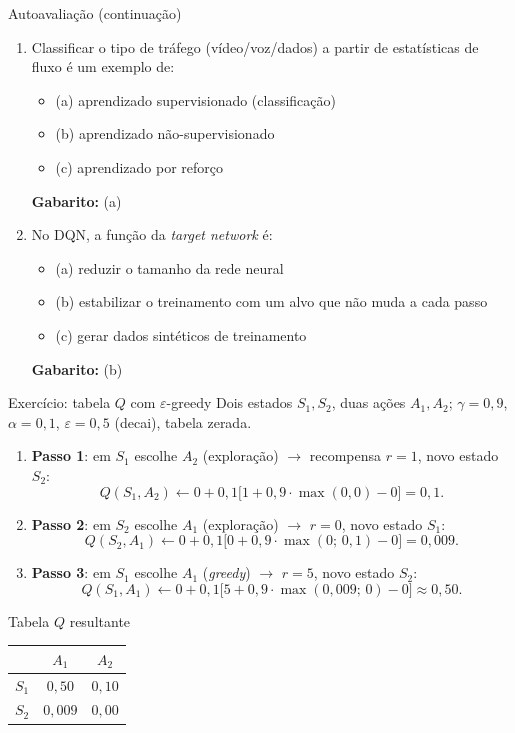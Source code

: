\documentclass[aspectratio=169,11pt]{beamer}
\begin{document}
\begin{frame}{Autoavaliação (continuação)}
  \begin{enumerate}
    \item Classificar o tipo de tráfego (vídeo/voz/dados) a partir de estatísticas de fluxo é um exemplo de:
      \begin{itemize}
        \item (a) aprendizado supervisionado (classificação)
        \item (b) aprendizado não-supervisionado
        \item (c) aprendizado por reforço
      \end{itemize}
      \pause
      \textbf{Gabarito:} (a)

    \item No DQN, a função da \emph{target network} é:
      \begin{itemize}
        \item (a) reduzir o tamanho da rede neural
        \item (b) estabilizar o treinamento com um alvo que não muda a cada passo
        \item (c) gerar dados sintéticos de treinamento
      \end{itemize}
      \pause
      \textbf{Gabarito:} (b)
  \end{enumerate}
\end{frame}

\begin{frame}{Exercício: tabela $Q$ com $\varepsilon$-greedy}
  Dois estados $S_1,S_2$, duas ações $A_1,A_2$; $\gamma=0{,}9$, $\alpha=0{,}1$, $\varepsilon=0{,}5$ (decai), tabela zerada.
  \begin{enumerate}\small
    \item \textbf{Passo 1}: em $S_1$ escolhe $A_2$ (exploração) $\to$ recompensa $r=1$, novo estado $S_2$:
      $$Q(S_1,A_2) \leftarrow 0 + 0{,}1\big[1 + 0{,}9\cdot\max(0,0) - 0\big] = 0{,}1.$$
    \item \textbf{Passo 2}: em $S_2$ escolhe $A_1$ (exploração) $\to$ $r=0$, novo estado $S_1$:
      $$Q(S_2,A_1) \leftarrow 0 + 0{,}1\big[0 + 0{,}9\cdot\max(0;\,0{,}1) - 0\big] = 0{,}009.$$
    \item \textbf{Passo 3}: em $S_1$ escolhe $A_1$ (\emph{greedy}) $\to$ $r=5$, novo estado $S_2$:
      $$Q(S_1,A_1) \leftarrow 0 + 0{,}1\big[5 + 0{,}9\cdot\max(0{,}009;\,0) - 0\big] \approx 0{,}50.$$
  \end{enumerate}
  \pause
  \begin{block}{Tabela $Q$ resultante}
    \centering
    \begin{tabular}{lcc}
      \toprule
       & $A_1$ & $A_2$\\
      \midrule
      $S_1$ & $0{,}50$ & $0{,}10$\\
      $S_2$ & $0{,}009$ & $0{,}00$\\
      \bottomrule
    \end{tabular}
  \end{block}
\end{frame}
\end{document}
